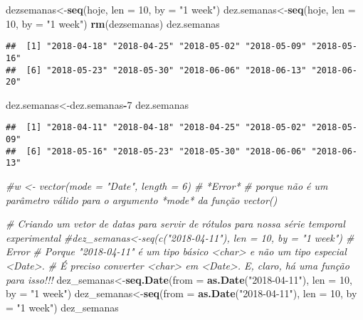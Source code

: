 \documentclass[]{article}
\newenvironment{Shaded}{\begin{snugshade}}{\end{snugshade}}
\newcommand{\KeywordTok}[1]{\textcolor[rgb]{0.13,0.29,0.53}{\textbf{#1}}}
\newcommand{\DataTypeTok}[1]{\textcolor[rgb]{0.13,0.29,0.53}{#1}}
\newcommand{\DecValTok}[1]{\textcolor[rgb]{0.00,0.00,0.81}{#1}}
\newcommand{\StringTok}[1]{\textcolor[rgb]{0.31,0.60,0.02}{#1}}
\newcommand{\CommentTok}[1]{\textcolor[rgb]{0.56,0.35,0.01}{\textit{#1}}}
\newcommand{\OperatorTok}[1]{\textcolor[rgb]{0.81,0.36,0.00}{\textbf{#1}}}
\newcommand{\NormalTok}[1]{#1}
\begin{document}
\begin{Shaded}
\begin{Highlighting}[]
\NormalTok{dezsemanas<-}\KeywordTok{seq}\NormalTok{(hoje, }\DataTypeTok{len =} \DecValTok{10}\NormalTok{, }\DataTypeTok{by =} \StringTok{"1 week"}\NormalTok{)}
\NormalTok{dez.semanas<-}\KeywordTok{seq}\NormalTok{(hoje, }\DataTypeTok{len =} \DecValTok{10}\NormalTok{, }\DataTypeTok{by =} \StringTok{"1 week"}\NormalTok{)}
\KeywordTok{rm}\NormalTok{(dezsemanas)}
\NormalTok{dez.semanas}
\end{Highlighting}
\end{Shaded}

\begin{verbatim}
##  [1] "2018-04-18" "2018-04-25" "2018-05-02" "2018-05-09" "2018-05-16"
##  [6] "2018-05-23" "2018-05-30" "2018-06-06" "2018-06-13" "2018-06-20"
\end{verbatim}

\begin{Shaded}
\begin{Highlighting}[]
\NormalTok{dez.semanas<-dez.semanas}\OperatorTok{-}\DecValTok{7}
\NormalTok{dez.semanas}
\end{Highlighting}
\end{Shaded}

\begin{verbatim}
##  [1] "2018-04-11" "2018-04-18" "2018-04-25" "2018-05-02" "2018-05-09"
##  [6] "2018-05-16" "2018-05-23" "2018-05-30" "2018-06-06" "2018-06-13"
\end{verbatim}

\begin{Shaded}
\begin{Highlighting}[]
\CommentTok{#w <- vector(mode = "Date", length = 6) # *Error*}
\CommentTok{# porque não é um parâmetro válido para o argumento *mode* da função vector()}

\CommentTok{# Criando um vetor de datas para servir de rótulos para nossa série temporal experimental}
\CommentTok{#dez_semanas<-seq(c("2018-04-11"), len = 10, by = "1 week") # Error}
\CommentTok{# Porque "2018-04-11" é um tipo básico <char> e não um tipo especial <Date>.}
\CommentTok{# É preciso converter <char> em <Date>. E, claro, há uma função para isso!!!}
\NormalTok{dez_semanas<-}\KeywordTok{seq.Date}\NormalTok{(}\DataTypeTok{from =} \KeywordTok{as.Date}\NormalTok{(}\StringTok{"2018-04-11"}\NormalTok{), }\DataTypeTok{len =} \DecValTok{10}\NormalTok{, }\DataTypeTok{by =} \StringTok{"1 week"}\NormalTok{)}
\NormalTok{dez_semanas<-}\KeywordTok{seq}\NormalTok{(}\DataTypeTok{from =} \KeywordTok{as.Date}\NormalTok{(}\StringTok{"2018-04-11"}\NormalTok{), }\DataTypeTok{len =} \DecValTok{10}\NormalTok{, }\DataTypeTok{by =} \StringTok{"1 week"}\NormalTok{)}
\NormalTok{dez_semanas}
\end{Highlighting}
\end{Shaded}
\end{document}
